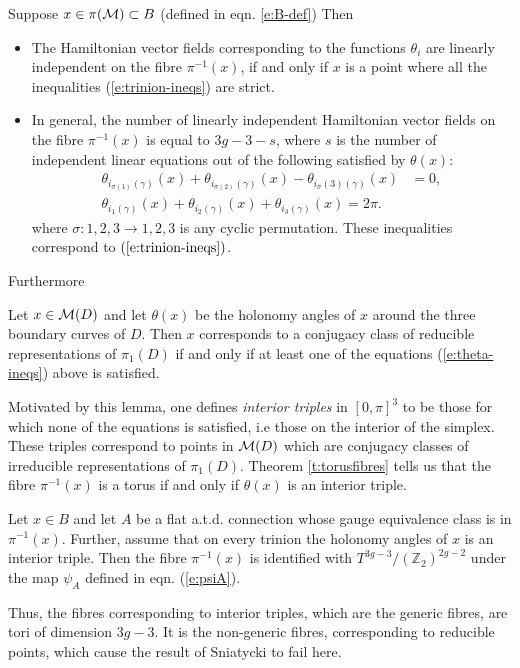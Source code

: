 	\begin{theorem}
		\label{t:torusfibres}
		Suppose $x\in \pi(\mathcal{M}) \subset B$ (defined in eqn. \ref{e:B-def}) Then
		\begin{itemize}
			\item The Hamiltonian vector fields corresponding to the functions $\theta_i$ are linearly independent on the fibre $\pi^{-1}(x)$, if and only if $x$ is a point where all the inequalities (\ref{e:trinion-ineqs}) are strict.
			\item In general, the number of linearly independent Hamiltonian vector fields on the fibre $\pi^{-1}(x)$ is equal to $3g-3-s$, where $s$ is the number of independent linear equations out of the following satisfied by $\theta(x)$:
				\begin{align*}
					\theta_{i_{\sigma(1)}(\gamma)}(x) + \theta_{i_{\sigma(2)}(\gamma)}(x)-\theta_{i{_\sigma(3)}(\gamma)}(x)&=0,\\
					\theta_{i_1(\gamma)}(x) + \theta_{i_2(\gamma)}(x) + \theta_{i_3(\gamma)}(x) = 2\pi.
				\end{align*}
			where $\sigma:{1,2,3}\to{1,2,3}$ is any cyclic permutation. These inequalities correspond to $(\ref{e:trinion-ineqs})$.
		\end{itemize}
	\end{theorem}
	Furthermore
	\begin{lemma}
		Let $x\in \mathcal{M}(D)$ and let $\theta(x)$ be the holonomy angles of $x$ around the three boundary curves of $D$. Then $x$ corresponds to a conjugacy class of reducible representations of $\pi_1(D)$ if and only if at least one of the equations (\ref{e:theta-ineqs}) above is satisfied.
	\end{lemma}
	Motivated by this lemma, one defines \emph{interior triples} in $[0,\pi]^3$ to be those for which none of the equations is satisfied, i.e those on the interior of the simplex. These triples correspond to points in $\mathcal{M}(D)$ which are conjugacy classes of irreducible representations of $\pi_1(D)$. Theorem \ref{t:torusfibres} tells us that the fibre $\pi^{-1}(x)$ is a torus if and only if $\theta(x)$ is an interior triple.
	\begin{theorem}
		Let $x\in B$ and let $A$ be a flat a.t.d. connection whose gauge equivalence class is in $\pi^{-1}(x)$. Further, assume that on every trinion the holonomy angles of $x$ is an interior triple. Then the fibre $\pi^{-1}(x)$ is identified with $T^{3g-3}/(\mathbb{Z}_2)^{2g-2}$ under the map $\psi_A$ defined in eqn. (\ref{e:psiA}).
	\end{theorem}
	Thus, the fibres corresponding to interior triples, which are the generic fibres, are tori of dimension $3g-3$. It is the non-generic fibres, corresponding to reducible points, which cause the result of Sniatycki to fail here.
	
